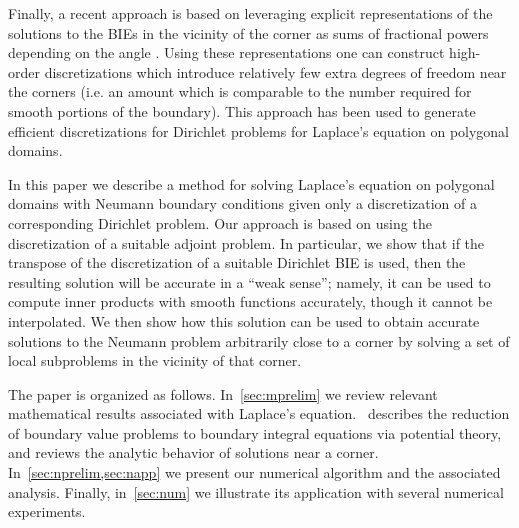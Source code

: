  Finally, a recent approach is based on leveraging explicit representations of the solutions to the BIEs in the vicinity of the corner as sums of fractional powers depending on the angle \cite{serkhacha,serkh2016solution}. Using these representations one can construct high-order discretizations which introduce relatively few extra degrees of freedom near the corners (i.e. an amount which is comparable to the number required for smooth portions of the boundary). This approach has been used to generate efficient discretizations for Dirichlet problems for Laplace's equation on polygonal domains\cite{hoskins2019numerical}. 
 
 In this paper we describe a method for solving Laplace's equation on polygonal domains with Neumann boundary conditions given only a discretization of a corresponding Dirichlet problem. Our approach is based on using the discretization of a suitable adjoint problem. In particular, we show that if the transpose of the discretization of a suitable Dirichlet BIE is used, then the resulting solution will be accurate in a ``weak sense''; namely, it can be used to compute inner products with smooth functions accurately, though it cannot be interpolated. We then show how this solution can be used to obtain accurate solutions to the Neumann problem arbitrarily close to a corner by solving a set of local subproblems in the vicinity of that corner.
 
 The paper is organized as follows. In~\cref{sec:mprelim} we review relevant mathematical results associated with Laplace's equation.~ describes the reduction of boundary value problems to boundary integral equations via potential theory, and reviews the analytic behavior of solutions near a corner. In~\cref{sec:nprelim,sec:napp} we present our numerical algorithm and the associated analysis. Finally, in~\cref{sec:num} we illustrate its application with several numerical experiments.
